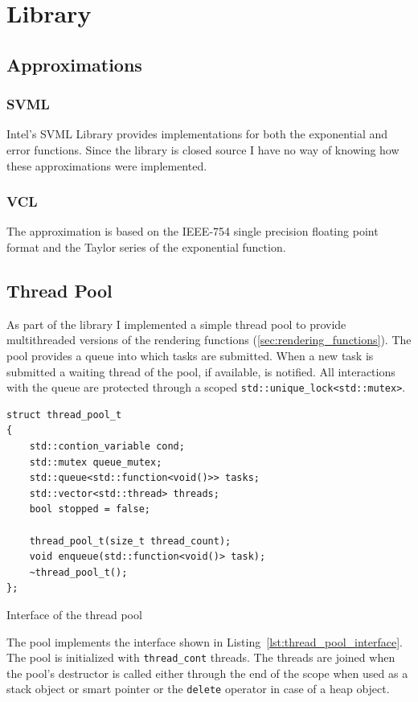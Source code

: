 \documentclass[a4paper, 11pt]{memoir}
\begin{document}
    \section{Library}
    \subsection{Approximations}
    \subsubsection{SVML}
    Intel's SVML Library provides implementations for both the exponential and error functions. Since the library is closed source I have no way of knowing how these approximations were implemented.
    \subsubsection{VCL}
    The approximation is based on the IEEE-754 single precision floating point format and the Taylor series of the exponential function.
    \subsection{Thread Pool}
    \label{sec:thread_pool}
    As part of the library I implemented a simple thread pool to provide multithreaded versions of the rendering functions (\ref{sec:rendering_functions}).
    The pool provides a queue into which tasks are submitted. When a new task is submitted a waiting thread of the pool, if available, is notified.
    All interactions with the queue are protected through a scoped \texttt{std::unique_lock<std::mutex>}.

    \begin{listing}[H]
        \begin{verbatim}
struct thread_pool_t
{
    std::contion_variable cond;
    std::mutex queue_mutex;
    std::queue<std::function<void()>> tasks;
    std::vector<std::thread> threads;
    bool stopped = false;

    thread_pool_t(size_t thread_count);
    void enqueue(std::function<void()> task);
    ~thread_pool_t();
};
        \end{verbatim}
        \caption{Interface of the thread pool}
        \label{lst:thread_pool_interface}
    \end{listing}

    The pool implements the interface shown in Listing~\ref{lst:thread_pool_interface}.
    The pool is initialized with \texttt{thread_cont} threads. The threads are joined when the pool's destructor is called either through the end of the scope when
    used as a stack object or smart pointer or the \texttt{delete} operator in case of a heap object.
\end{document}
